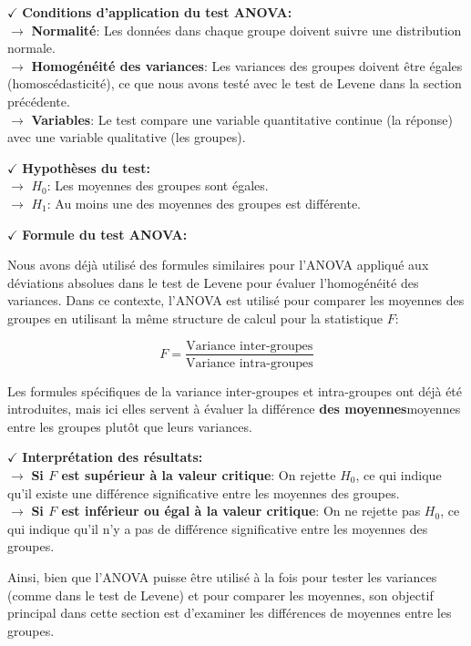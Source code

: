 \textbf{\(\checkmark\)} \textbf{Conditions d'application du test ANOVA:}\\
\textbf{\(\rightarrow\)} \textbf{Normalité}: Les données dans chaque groupe doivent suivre une distribution normale.\\
\textbf{\(\rightarrow\)} \textbf{Homogénéité des variances}: Les variances des groupes doivent être égales (homoscédasticité), ce que nous avons testé avec le test de Levene dans la section précédente.\\
\textbf{\(\rightarrow\)} \textbf{Variables}: Le test compare une variable quantitative continue (la réponse) avec une variable qualitative (les groupes).
    
\textbf{\(\checkmark\)} \textbf{Hypothèses du test:}\\
\textbf{\(\rightarrow\)} \( H_0 \): Les moyennes des groupes sont égales.\\
\textbf{\(\rightarrow\)} \( H_1 \): Au moins une des moyennes des groupes est différente.
    
    \textbf{\(\checkmark\)} \textbf{Formule du test ANOVA:}
    
    Nous avons déjà utilisé des formules similaires pour l'ANOVA appliqué aux déviations absolues dans le test de Levene pour évaluer l'homogénéité des variances. Dans ce contexte, l'ANOVA est utilisé pour comparer les moyennes des groupes en utilisant la même structure de calcul pour la statistique \( F \):
    
    \[
    F = \frac{\text{Variance inter-groupes}}{\text{Variance intra-groupes}}
    \]
    
Les formules spécifiques de la variance inter-groupes et intra-groupes ont déjà été introduites, mais ici elles servent à évaluer la différence \textbf{des moyennes}moyennes entre les groupes plutôt que leurs variances.
    
\textbf{\(\checkmark\)} \textbf{Interprétation des résultats:}\\
\textbf{\(\rightarrow\)}\textbf{ Si \( F \) est supérieur à la valeur critique}: On rejette \( H_0 \), ce qui indique qu'il existe une différence significative entre les moyennes des groupes.\\
\textbf{\(\rightarrow\)}\textbf{ Si \( F \) est inférieur ou égal à la valeur critique}: On ne rejette pas \( H_0 \), ce qui indique qu'il n'y a pas de différence significative entre les moyennes des groupes.
    
Ainsi, bien que l'ANOVA puisse être utilisé à la fois pour tester les variances (comme dans le test de Levene) et pour comparer les moyennes, son objectif principal dans cette section est d'examiner les différences de moyennes entre les groupes.    
    
